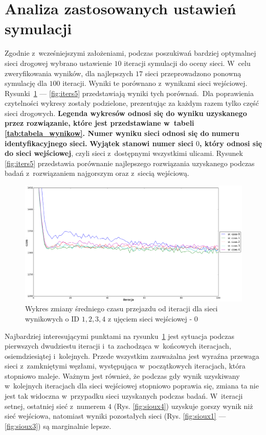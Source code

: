 \documentclass[twoside,12pt]{report}
\begin{document}
\section{Analiza zastosowanych ustawień symulacji}
Zgodnie z~wcześniejszymi założeniami, podczas poszukiwań bardziej optymalnej sieci drogowej wybrano ustawienie $10$ iteracji symulacji do oceny sieci. W~celu zweryfikowania wyników, dla najlepszych $17$ sieci przeprowadzono ponowną symulację dla $100$ iteracji. Wyniki te porównano z~wynikami sieci wejściowej. Rysunki~\ref{fig:iters1} --- \ref{fig:iters5} przedstawiają wyniki tych porównań.~Dla poprawienia czytelności wykresy zostały podzielone, prezentując za każdym razem tylko część sieci drogowych. \textbf{Legenda wykresów odnosi się do wyniku uzyskanego przez rozwiązanie, które jest przedstawiane w~tabeli \ref{tab:tabela_wynikow}. Numer wyniku sieci odnosi się do numeru identyfikacyjnego sieci.} \textbf{Wyjątek stanowi numer sieci $0$, który odnosi się do sieci wejściowej}, czyli sieci z~dostępnymi wszystkimi ulicami. Rysunek \ref{fig:iters5} przedstawia porównanie najlepszego rozwiązania uzyskanego podczas badań z~rozwiązaniem najgorszym oraz z~siecią wejściową.

\begin{figure}[htbp]
\centering
\includegraphics[width=1\textwidth]{img/iters/iters1}
\caption{Wykres zmiany średniego czasu przejazdu od iteracji dla sieci wynikowych o ID $1, 2, 3, 4$ z ujęciem sieci wejściowej - $0$}
\label{fig:iters1}
\end{figure}

Najbardziej interesującymi punktami na rysunku~\ref{fig:iters1} jest sytuacja podczas pierwszych dwudziestu iteracji i~ta zachodząca w~końcowych iteracjach, osiemdziesiątej i~kolejnych. Przede wszystkim zauważalna jest wyraźna przewaga sieci z~zamkniętymi węzłami, występująca w~początkowych iteracjach, która stopniowo maleje. Ważnym jest również, że podczas gdy wynik uzyskiwany w~kolejnych iteracjach dla sieci wejściowej stopniowo poprawia się, zmiana ta nie jest tak widoczna w~przypadku sieci uzyskanych podczas badań. W~iteracji setnej, ostatniej sieć z~numerem $4$ (Rys. \ref{fig:sioux4}) uzyskuje gorszy wynik niż sieć wejściowa, natomiast wyniki pozostałych sieci (Rys. \ref{fig:sioux1} --- \ref{fig:sioux3}) są marginalnie lepsze.
\end{document}
